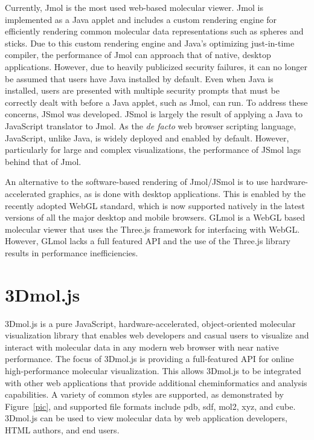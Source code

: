 \documentclass[]{bioinfo}
\begin{document}
Currently, Jmol\cite{jmol,hanson2010jmol} is the most used web-based molecular viewer. Jmol is implemented as a Java applet and includes a custom rendering engine for efficiently rendering common molecular data representations such as spheres and sticks.  Due to this custom rendering engine and Java's optimizing just-in-time compiler, the performance of Jmol can approach that of native, desktop applications.  However, due to heavily publicized security failures, it can no longer be assumed that users have Java installed by default\cite{doomedjava}.  Even when Java is installed, users are presented with multiple security prompts that must be correctly dealt with before a Java applet, such as Jmol, can run.
To address these concerns, JSmol\cite{hanson2013jsmol} was developed. JSmol is largely the result of applying a Java to JavaScript translator to Jmol. As the \textit{de facto} web browser scripting language, JavaScript, unlike Java, is widely deployed and enabled by default.  However, particularly for large and complex visualizations, the performance of JSmol lags behind that of Jmol.

An alternative to the software-based rendering of Jmol/JSmol is to use hardware-accelerated graphics, as is done with desktop applications.  This is enabled by the recently adopted WebGL\cite{webgl} standard, which is now supported natively in the latest versions of all the major desktop and mobile browsers. GLmol\cite{glmol} is a WebGL based molecular viewer that uses the Three.js\cite{threejs} framework for interfacing with WebGL.  However, GLmol lacks a full featured API and the use of the Three.js library results in performance inefficiencies.



\section{3Dmol.js}

3Dmol.js is a pure JavaScript, hardware-accelerated, object-oriented molecular visualization library that enables web developers and casual users to visualize and interact with molecular data in any modern web browser with near native performance.  The focus of 3Dmol.js is providing a full-featured API for online high-performance molecular visualization. This allows 3Dmol.js to be integrated with other web applications that provide additional cheminformatics and analysis capabilities.
A variety of common styles are supported, as demonstrated by Figure~\ref{pic}, and supported file formats include pdb, sdf, mol2, xyz, and cube.
3Dmol.js can be used to view molecular data by web application developers, HTML authors, and end users.  
\end{document}
